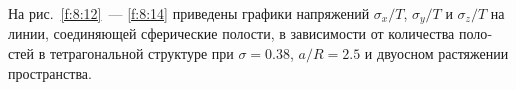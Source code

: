 \begin{russian}




На рис.~\ref{f:8:12}~--- \ref{f:8:14} приведены графики напряжений $\sigma_x/T$, $\sigma_y/T$ и $\sigma_z/T$ на линии, соединяющей сферические полости, в зависимости от количества полостей в тетрагональной структуре при $\sigma=0.38$, $a/R=2.5$ и двуосном растяжении пространства.


\end{russian}
